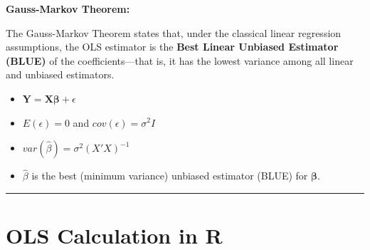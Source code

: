 \documentclass[
  letterpaper,
  DIV=11,
  numbers=noendperiod]{scrreprt}
\newenvironment{Shaded}{\begin{snugshade}}{\end{snugshade}}
\newcommand{\CommentTok}[1]{\textcolor[rgb]{0.37,0.37,0.37}{#1}}
\newcommand{\DecValTok}[1]{\textcolor[rgb]{0.68,0.00,0.00}{#1}}
\newcommand{\FunctionTok}[1]{\textcolor[rgb]{0.28,0.35,0.67}{#1}}
\newcommand{\NormalTok}[1]{\textcolor[rgb]{0.00,0.23,0.31}{#1}}
\newcommand{\OtherTok}[1]{\textcolor[rgb]{0.00,0.23,0.31}{#1}}
\newcommand{\SpecialCharTok}[1]{\textcolor[rgb]{0.37,0.37,0.37}{#1}}
\begin{document}
\begin{tcolorbox}[enhanced jigsaw, rightrule=.15mm, breakable, left=2mm, colframe=quarto-callout-note-color-frame, opacityback=0, leftrule=.75mm, toprule=.15mm, colback=white, arc=.35mm, bottomrule=.15mm]

\textbf{Gauss-Markov Theorem:}\vspace{2mm}

The Gauss-Markov Theorem states that, under the classical linear
regression assumptions, the OLS estimator is the \textbf{Best Linear
Unbiased Estimator (BLUE)} of the coefficients---that is, it has the
lowest variance among all linear and unbiased estimators.

\begin{itemize}
\item
  \(\mathbf{Y} = \mathbf{X\beta} +\epsilon\)
\item
  \(E(\epsilon) = 0\) and \(cov(\epsilon) = \sigma^2 I\)
\item
  \(var(\hat{\beta}) = \sigma^2 (X'X)^{-1}\)
\item
  \(\hat{\beta}\) is the best (minimum variance) unbiased estimator
  (BLUE) for \(\mathbf{\beta}\).
\end{itemize}

\end{tcolorbox}

\begin{center}\rule{0.5\linewidth}{0.5pt}\end{center}

\hypertarget{ols-calculation-in-r}{%
\section*{OLS Calculation in R}\label{ols-calculation-in-r}}


\begin{Shaded}
\end{Shaded}
\end{document}
